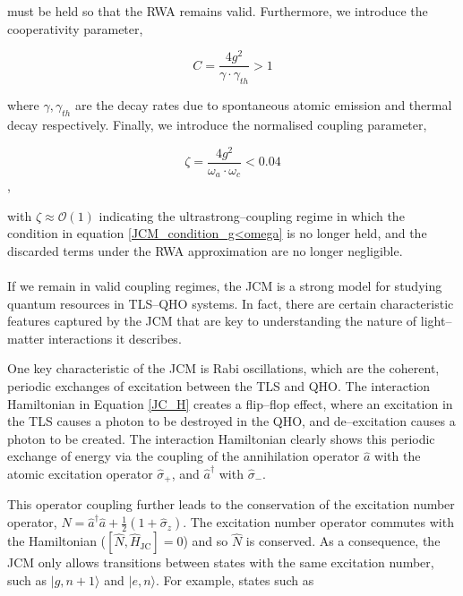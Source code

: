 \documentclass[11pt]{article}
\begin{document}
must be held so that the RWA remains valid. Furthermore, we introduce the cooperativity parameter,

\begin{equation} \label{JCM_condition_cooperativity}
    C = \frac{4g^2}{\gamma\cdot\gamma_{\scriptscriptstyle th}} > 1
\end{equation}

where $\gamma, \gamma_{\scriptscriptstyle th}$ are the decay rates due to spontaneous atomic emission and thermal decay respectively. Finally, we introduce the normalised coupling parameter, 

\begin{equation} \label{JCM_condition_norm_coupling}
    \zeta = \frac{4g^2}{\omega_a\cdot\omega_c} < 0.04
\end{equation}, 

with $\zeta \approx \mathcal{O}(1)$ indicating the ultrastrong--coupling regime in which the condition in equation \eqref{JCM_condition_g<omega} is no longer held, and the discarded terms under the RWA approximation are no longer negligible.\\
\\
If we remain in valid coupling regimes, the JCM is a strong model for studying quantum resources in TLS--QHO systems. In fact, there are certain characteristic features captured by the JCM that are key to understanding the nature of light--matter interactions it describes. 

One key characteristic of the JCM is Rabi oscillations, which are the coherent, periodic exchanges of excitation between the TLS and QHO. The interaction Hamiltonian in Equation \eqref{JC_H} creates a flip--flop effect, where an excitation in the TLS causes a photon to be destroyed in the QHO, and de--excitation causes a photon to be created. The interaction Hamiltonian clearly shows this periodic exchange of energy via the coupling of the annihilation operator $\hat{a}$ with the atomic excitation operator $\hat{\sigma}_+$, and $\hat{a}^\dagger$ with $\hat{\sigma}_-$.

This operator coupling further leads to the conservation of the excitation number operator, $\hat{N} = \hat{a}^\dagger \hat{a} + \frac{1}{2}(1 + \hat{\sigma}_z)$. The excitation number operator commutes with the Hamiltonian ($[\hat{N}, \hat{H}_{\scriptscriptstyle \text{JC}}] = 0$) and so $\hat{N}$ is conserved. As a consequence, the JCM only allows transitions between states with the same excitation number, such as $|g, n+1\rangle$ and $|e,n\rangle$. For example, states such as
\end{document}
